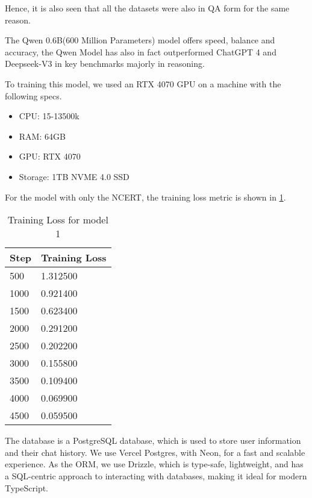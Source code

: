 \documentclass[9pt,a4paper,twocolumn,twoside]{tau-class/tau}
\begin{document}
Hence, it is also seen that all the datasets were also in QA form for the same reason.

The Qwen 0.6B(600 Million Parameters) model offers speed, balance and accuracy, the Qwen Model has also in fact outperformed ChatGPT 4 and Deepseek-V3 in key benchmarks majorly in reasoning.

To training this model, we used an RTX 4070 GPU on a machine with the following specs.
\begin{itemize}
	\item CPU: 15-13500k
	\item RAM: 64GB
	\item GPU: RTX 4070
	\item Storage: 1TB NVME 4.0 SSD
\end{itemize} For the model with only the NCERT, the training loss metric is shown in \ref{tab:train_loss}.
\begin{table}[H]
	\centering
	\caption{Training Loss for model 1}
	\label{tab:train_loss}
	\begin{tabular}{ll}
		\toprule
		\textbf{Step} & \textbf{Training Loss} \\
		\midrule
		500           & 1.312500               \\
		1000          & 0.921400               \\
		1500          & 0.623400               \\
		2000          & 0.291200               \\
		2500          & 0.202200               \\
		3000          & 0.155800               \\
		3500          & 0.109400               \\
		4000          & 0.069900               \\
		4500          & 0.059500               \\
		\bottomrule
	\end{tabular}
\end{table}


The database is a PostgreSQL database, which is used to store user information and their chat history. We use Vercel Postgres, with Neon, for a fast and scalable experience. As the ORM, we use Drizzle, which is type-safe, lightweight, and has a SQL-centric approach to interacting with databases, making it ideal for modern TypeScript.
\end{document}
